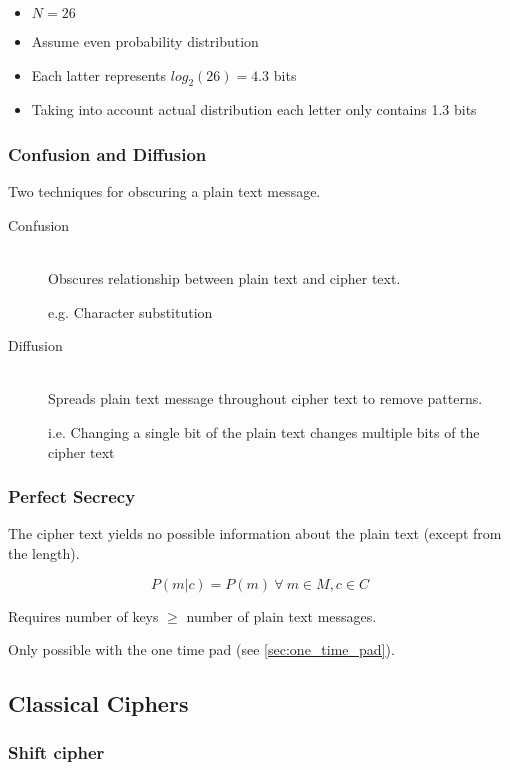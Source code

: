 \documentclass[a4paper]{article}
\begin{document}
\begin{itemize}
  \item $N = 26$
  \item Assume even probability distribution
  \item Each latter represents $log_{2}(26) = 4.3$ bits
  \item Taking into account actual distribution each letter only contains 1.3
        bits
\end{itemize}

\subsubsection{Confusion and Diffusion}

Two techniques for obscuring a plain text message.

\begin{description}
  \item[Confusion] \hfill \\
    Obscures relationship between plain text and cipher text.

    e.g. Character substitution

  \item[Diffusion] \hfill \\
    Spreads plain text message throughout cipher text to remove patterns.

    i.e. Changing a single bit of the plain text changes multiple bits of the
    cipher text
\end{description}

\subsubsection{Perfect Secrecy}

The cipher text yields no possible information about the plain text (except from
the length).

\[
  P(m|c) = P(m) \: \forall \: m \in M, c \in C
\]

Requires number of keys $\geq$ number of plain text messages.

Only possible with the one time pad (see \ref{sec:one_time_pad}).

\subsection{Classical Ciphers}

\subsubsection{Shift cipher}
\end{document}
